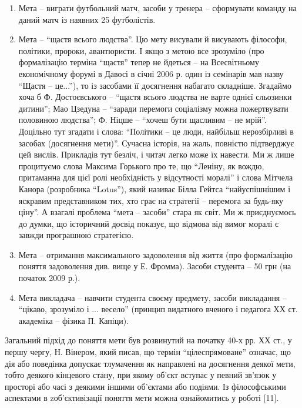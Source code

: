 \begin{enumerate}
\begin{enumerate}
		\item Мета -- виграти футбольний матч, засоби у тренера -- сформувати команду на даний матч із наявних 25 футболістів. 
		\item Мета -- ``щастя всього людства''. Цю мету висували й висувають філософи, політики, пророки, авантюристи. І якщо з метою все зрозуміло (про формалізацію терміна ``щастя'' тепер не йдеться -- на Всесвітньому економічному форумі в Давосі в січні 2006 р. один із семінарів мав назву ``Щастя -- це...''), то із засобами її досягнення набагато складніше. Згадаймо хоча б Ф. Достоєвського -- ``щастя всього людства не варте однієї сльозинки дитини''; Мао Цзедуна -- ``заради перемоги соціалізму можна пожертвувати половиною людства''; Ф. Ніцше -- ``хочеш бути щасливим -- не мрій''. \\

		Доцільно тут згадати і слова: ``Політики -- це люди, найбільш нерозбірливі в засобах (досягнення мети)''. Сучасна історія, на жаль, повністю підтверджує цей вислів. Прикладів тут безліч, і читач легко може їх навести. Ми ж лише процитуємо слова Максима Горького про те, що ``Леніну, як вождю, притаманна для цієї ролі необхідність у відсутності моралі'' і слова Мітчела Канора (розробника ``Lotus''), який називає Білла Гейтса ``найуспішнішим і яскравим представником тих, хто грає на стратегії -- перемога за будь-яку ціну''. А взагалі проблема ``мета -- засоби'' стара як світ. Ми ж приєднуємось до думки, що історичний досвід показує, що відмова від вимог моралі є завжди програшною стратегією.
		\item Мета -- отримання максимального задоволення від життя (про формалізацію поняття задоволення див. вище у Е. Фромма). Засоби студента -- 50 грн (на початок 2009 р.).
		\item Мета викладача -- навчити студента своєму предмету, засоби викладання -- ``цікаво, зрозуміло і ... весело'' (принцип видатного вченого і педагога ХХ ст. академіка -- фізика П. Капіци).
	\end{enumerate}
	Загальний підхід до поняття мети був розвинутий на початку 40-х рр. ХХ ст., у першу чергу, Н. Вінером, який писав, що термін ``цілеспрямоване'' означає, що дія або поведінка допускає тлумачення як направлені на досягнення деякої мети, тобто деякого кінцевого стану, при якому об'єкт вступає у певний зв'язок у просторі або часі з деякими іншими об'єктами або подіями. Із філософськими аспектами в zоб'єктивізації поняття мети можна ознайомитись у роботі [11]. \\


\end{enumerate}

